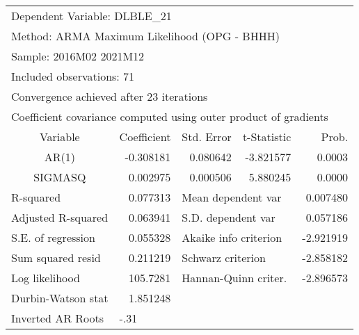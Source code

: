 \begin{tabular}{lrrrr}
\toprule
\multicolumn{3}{l}{Dependent Variable: DLBLE\_21}&\multicolumn{1}{c}{}&\multicolumn{1}{c}{}\\
\multicolumn{4}{l}{Method: ARMA Maximum Likelihood (OPG - BHHH)}&\multicolumn{1}{c}{}\\
\multicolumn{2}{l}{Sample: 2016M02 2021M12}&\multicolumn{1}{c}{}&\multicolumn{1}{c}{}&\multicolumn{1}{c}{}\\
\multicolumn{2}{l}{Included observations: 71}&\multicolumn{1}{c}{}&\multicolumn{1}{c}{}&\multicolumn{1}{c}{}\\
\multicolumn{3}{l}{Convergence achieved after 23 iterations}&\multicolumn{1}{c}{}&\multicolumn{1}{c}{}\\
\multicolumn{5}{l}{Coefficient covariance computed using outer product of gradients}\\
\midrule
\multicolumn{1}{c}{Variable}&\multicolumn{1}{r}{Coefficient}&\multicolumn{1}{r}{Std. Error}&\multicolumn{1}{r}{t-Statistic}&\multicolumn{1}{r}{Prob.}\\
\midrule
\multicolumn{1}{c}{AR(1)}&\multicolumn{1}{r}{-0.308181}&\multicolumn{1}{r}{0.080642}&\multicolumn{1}{r}{-3.821577}&\multicolumn{1}{r}{0.0003}\\
\multicolumn{1}{c}{SIGMASQ}&\multicolumn{1}{r}{0.002975}&\multicolumn{1}{r}{0.000506}&\multicolumn{1}{r}{5.880245}&\multicolumn{1}{r}{0.0000}\\
\midrule
\multicolumn{1}{l}{R-squared}&\multicolumn{1}{r}{0.077313}&\multicolumn{2}{l}{Mean dependent var}&\multicolumn{1}{r}{0.007480}\\
\multicolumn{1}{l}{Adjusted R-squared}&\multicolumn{1}{r}{0.063941}&\multicolumn{2}{l}{S.D. dependent var}&\multicolumn{1}{r}{0.057186}\\
\multicolumn{1}{l}{S.E. of regression}&\multicolumn{1}{r}{0.055328}&\multicolumn{2}{l}{Akaike info criterion}&\multicolumn{1}{r}{-2.921919}\\
\multicolumn{1}{l}{Sum squared resid}&\multicolumn{1}{r}{0.211219}&\multicolumn{2}{l}{Schwarz criterion}&\multicolumn{1}{r}{-2.858182}\\
\multicolumn{1}{l}{Log likelihood}&\multicolumn{1}{r}{105.7281}&\multicolumn{2}{l}{Hannan-Quinn criter.}&\multicolumn{1}{r}{-2.896573}\\
\multicolumn{1}{l}{Durbin-Watson stat}&\multicolumn{1}{r}{1.851248}&\multicolumn{1}{c}{}&\multicolumn{1}{c}{}&\multicolumn{1}{c}{}\\
\midrule
\multicolumn{1}{l}{Inverted AR Roots}&\multicolumn{1}{l}{-.31}&\multicolumn{1}{c}{}&\multicolumn{1}{c}{}&\multicolumn{1}{c}{}\\
\bottomrule
\end{tabular}